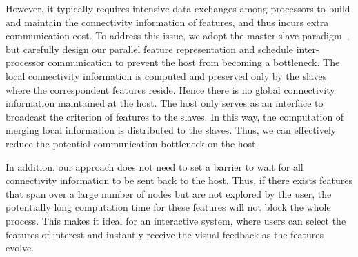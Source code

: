 However, it typically requires intensive data exchanges among processors to build and maintain the connectivity information of features, and thus incurs extra communication cost. To address this issue, we adopt the master-slave paradigm~\cite{Chen03realtime}, but carefully design our parallel feature representation and schedule inter-processor communication to prevent the host from becoming a bottleneck. The local connectivity information is computed and preserved only by the slaves where the correspondent features reside. Hence there is no global connectivity information maintained at the host. The host only serves as an interface to broadcast the criterion of features to the slaves. In this way, the computation of merging local information is distributed to the slaves. Thus, we can effectively reduce the potential communication bottleneck on the host.

In addition, our approach does not need to set a barrier to wait for all connectivity information to be sent back to the host. Thus, if there exists features that span over a large number of nodes but are not explored by the user, the potentially long computation time for these features will not block the whole process. This makes it ideal for an interactive system, where users can select the features of interest and instantly receive the visual feedback as the features evolve.

